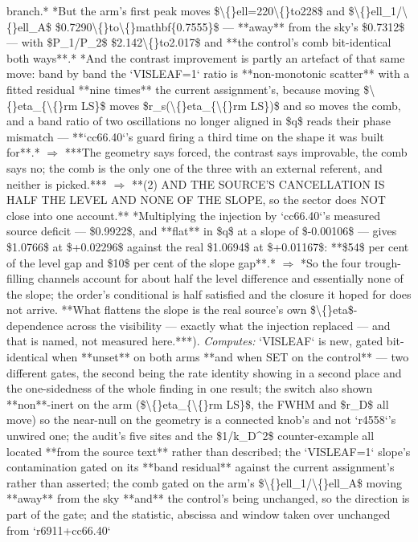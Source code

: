 \begin{description}
branch.*  *But the arm's first peak moves \$\textbackslash\{\}ell=220\textbackslash\{\}to228\$ and \$\textbackslash\{\}ell\_1/\textbackslash\{\}ell\_A\$ \$0.7290\textbackslash\{\}to\textbackslash\{\}mathbf\{0.7555\}\$ --- **away** from the sky's \$0.7312\$ --- with \$P\_1/P\_2\$ \$2.142\textbackslash\{\}to2.017\$ and **the control's comb bit-identical both ways**.*  *And the contrast improvement is partly an artefact of that same move: band by band the `VISLEAF=1` ratio is **non-monotonic scatter** with a fitted residual **nine times** the current assignment's, because moving \$\textbackslash\{\}eta\_\{\textbackslash\{\}rm LS\}\$ moves \$r\_s(\textbackslash\{\}eta\_\{\textbackslash\{\}rm LS\})\$ and so moves the comb, and a band ratio of two oscillations no longer aligned in \$q\$ reads their phase mismatch --- **`cc66.40`'s guard firing a third time on the shape it was built for**.* \ensuremath{\Rightarrow} ***The geometry says forced, the contrast says improvable, the comb says no; the comb is the only one of the three with an external referent, and neither is picked.*** \ensuremath{\Rightarrow}  **(2) AND THE SOURCE'S CANCELLATION IS HALF THE LEVEL AND NONE OF THE SLOPE, so the sector does NOT close into one account.** *Multiplying the injection by `cc66.40`'s measured source deficit --- \$0.9922\$, and **flat** in \$q\$ at a slope of \$-0.00106\$ --- gives \$1.0766\$ at \$+0.02296\$ against the real \$1.0694\$ at \$+0.01167\$: **\$54\$ per cent of the level gap and \$10\$ per cent of the slope gap**.* \ensuremath{\Rightarrow} *So the four trough-filling channels account for about half the level difference and essentially none of the slope; the order's conditional is half satisfied and the closure it hoped for does not arrive. **What flattens the slope is the real source's own \$\textbackslash\{\}eta\$-dependence across the visibility --- exactly what the injection replaced --- and that is named, not measured here.***). 
\emph{Computes:} `VISLEAF` is new, gated bit-identical when **unset** on both arms **and when SET on the control** --- two different gates, the second being the rate identity showing in a second place and the one-sidedness of the whole finding in one result; the switch also shown **non**-inert on the arm (\$\textbackslash\{\}eta\_\{\textbackslash\{\}rm LS\}\$, the FWHM and \$r\_D\$ all move) so the near-null on the geometry is a connected knob's and not `r4558`'s unwired one; the audit's five sites and the \$1/k\_D\textasciicircum{}2\$ counter-example all located **from the source text** rather than described; the `VISLEAF=1` slope's contamination gated on its **band residual** against the current assignment's rather than asserted; the comb gated on the arm's \$\textbackslash\{\}ell\_1/\textbackslash\{\}ell\_A\$ moving **away** from the sky **and** the control's being unchanged, so the direction is part of the gate; and the statistic, abscissa and window taken over unchanged from `r6911+cc66.40`

\end{description}
